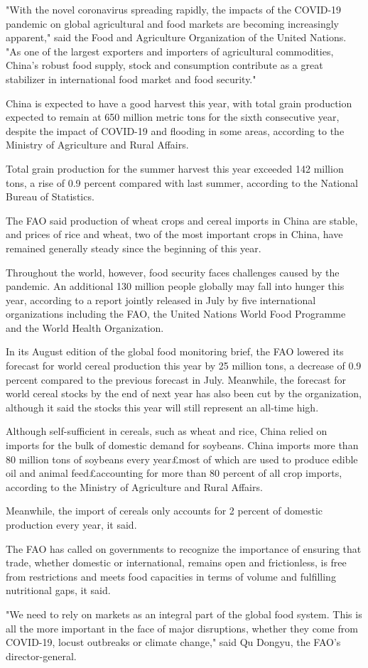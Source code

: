 \documentclass[a4paper]{article}
\begin{document}
 "With the novel coronavirus spreading rapidly, the impacts of the COVID-19 pandemic on global agricultural and food markets are becoming increasingly apparent," said the Food and Agriculture Organization of the United Nations. "As one of the largest exporters and importers of agricultural commodities, China's robust food supply, stock and consumption contribute as a great stabilizer in international food market and food security."

China is expected to have a good harvest this year, with total grain production expected to remain at 650 million metric tons for the sixth consecutive year, despite the impact of COVID-19 and flooding in some areas, according to the Ministry of Agriculture and Rural Affairs.

Total grain production for the summer harvest this year exceeded 142 million tons, a rise of 0.9 percent compared with last summer, according to the National Bureau of Statistics.

The FAO said production of wheat crops and cereal imports in China are stable, and prices of rice and wheat, two of the most important crops in China, have remained generally steady since the beginning of this year.

Throughout the world, however, food security faces challenges caused by the pandemic. An additional 130 million people globally may fall into hunger this year, according to a report jointly released in July by five international organizations including the FAO, the United Nations World Food Programme and the World Health Organization.

In its August edition of the global food monitoring brief, the FAO lowered its forecast for world cereal production this year by 25 million tons, a decrease of 0.9 percent compared to the previous forecast in July. Meanwhile, the forecast for world cereal stocks by the end of next year has also been cut by the organization, although it said the stocks this year will still represent an all-time high.

Although self-sufficient in cereals, such as wheat and rice, China relied on imports for the bulk of domestic demand for soybeans. China imports more than 80 million tons of soybeans every year£­most of which are used to produce edible oil and animal feed£­accounting for more than 80 percent of all crop imports, according to the Ministry of Agriculture and Rural Affairs.

Meanwhile, the import of cereals only accounts for 2 percent of domestic production every year, it said.

The FAO has called on governments to recognize the importance of ensuring that trade, whether domestic or international, remains open and frictionless, is free from restrictions and meets food capacities in terms of volume and fulfilling nutritional gaps, it said.

"We need to rely on markets as an integral part of the global food system. This is all the more important in the face of major disruptions, whether they come from COVID-19, locust outbreaks or climate change," said Qu Dongyu, the FAO's director-general.

\printindex
\end{document}
